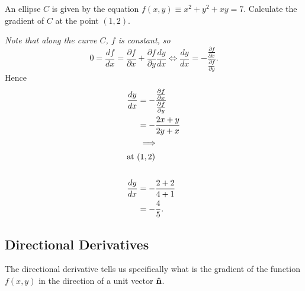 \documentclass[10pt, a4paper]{article}
\begin{document}
\begin{example}
    An ellipse $C$ is given by the equation $f(x, y) \equiv x ^ 2 + y ^ 2 + xy = 7$.
    Calculate the gradient of $C$ at the point $(1, 2)$.

    \begin{solution}
        \textit{Note that along the curve $C$,
        $f$ is constant,
        so}
        \[
        0 = \frac{df}{dx} = \frac{\partial f}{\partial x} + \frac{\partial f}{\partial y}\frac{dy}{dx} \iff \frac{dy}{dx} = -\frac{\frac{\partial f}{\partial x}}{\frac{\partial f}{\partial y}}.
        \]
        Hence
        \begin{align*}
            \frac{dy}{dx} &= -\frac{\frac{\partial f}{\partial x}}{\frac{\partial f}{\partial y}} \\
            &= -\frac{2x + y}{2y + x} \\
            &\implies \\
            \intertext{at $(1, 2)$} \\
            \frac{dy}{dx} &= -\frac{2 + 2}{4 + 1} \\
            &= -\frac{4}{5}.
        \end{align*}
    \end{solution}
\end{example}

\subsection{Directional Derivatives}
The directional derivative tells us specifically what is the gradient of the function $f(x, y)$ in the direction of a unit vector $\mathbf{\hat{n}}$.
\end{document}
